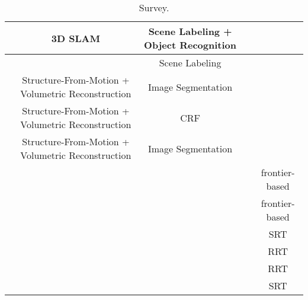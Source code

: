 \begin{sidewaystable}
{\begin{tabular}{|l|c|c|c|c|}
			\hline 			 
			\cite{nuchter2008ras} & 3D SLAM & Scene Labeling + Object Recognition &  &   \\ 
			\hline 			 
			\cite{xiong2010bmvc} &  & Scene Labeling &  &   \\ 
			\hline 			 
			\cite{blaha2016cvpr} & Structure-From-Motion + Volumetric Reconstruction & Image Segmentation &  &  \\ 
			\hline 			 
			\cite{kundu2014eccv} & Structure-From-Motion + Volumetric Reconstruction & CRF &  &   \\ 
			\hline 			 
			\cite{hane2013cvpr} & Structure-From-Motion + Volumetric Reconstruction & Image Segmentation &  &   \\ 
			\hline 			 
			\cite{yamauchi1997cira,yamauchi1998frontier,wang2011frontier} &  &  &  &  frontier-based  \\ 
			\hline 			 
			\cite{senarathne2013efficient,keidar2012robot} &  &  &  &  frontier-based  \\ 
			\hline 			 
			\cite{oriolo2004icra,freda2005icra} &  &  &  & SRT \\ 
			\hline 			 
			\cite{lavalle1998rapidly} &  &  &  &  RRT \\ 
			\hline 			
			\cite{bircher2016icra} & & &  &  RRT  \\ 
			\hline 			 
			\cite{el2013improved,franchi2009sensor} &  &  &  &  SRT \\ 
			\hline 			 
		\end{tabular}}
		\caption{Survey.}
		\label{tab:survey}
	\end{sidewaystable}